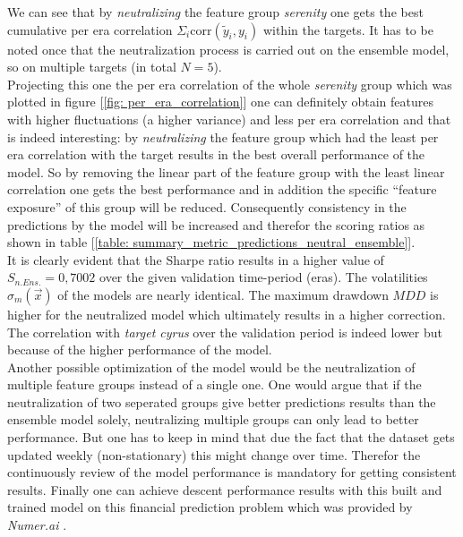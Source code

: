 \documentclass[12pt, a4paper]{article}
\begin{document}
We can see that by \textit{neutralizing} the feature group \textit{serenity} one gets the best cumulative per era correlation $\Sigma_i \text{corr}(\tilde{y}_i,y_i)$ within the targets. It has to be noted once that the neutralization process is carried out on the ensemble model, so on multiple targets (in total $N = 5$). \\
Projecting this one the per era correlation of the whole \textit{serenity} group which was plotted in figure [\ref{fig: per_era_correlation}] one can definitely obtain features with higher fluctuations (a higher variance) and less per era correlation and that is indeed interesting: by \textit{neutralizing} the feature group which had the least per era correlation with the target results in the best overall performance of the model. So by removing the linear part of the feature group with the least linear correlation one gets the best performance and in addition the specific ``feature exposure'' of this group will be reduced. Consequently consistency in the predictions by the model will be increased and therefor the scoring ratios as shown in table [\ref{table: summary_metric_predictions_neutral_ensemble}]. \\
It is clearly evident that the Sharpe ratio results in a higher value of $S_{n.Ens.} = 0{,}7002$ over the given validation time-period (eras). The volatilities $\sigma_{m}(\vec{x})$ of the models are nearly identical. The maximum drawdown $MDD$ is higher for the neutralized model which ultimately results in a higher correction. \\
The correlation with \textit{target cyrus} over the validation period is indeed lower but because of the higher performance of the model. \\
Another possible optimization of the model would be the neutralization of multiple feature groups instead of a single one. One would argue that if the neutralization of two seperated groups give better predictions results than the ensemble model solely, neutralizing multiple groups can only lead to better performance. But one has to keep in mind that due the fact that the dataset gets updated weekly (non-stationary) this might change over time. Therefor the continuously review of the model performance is mandatory for getting consistent results.
Finally one can achieve descent performance results with this built and trained model on this financial prediction problem which was provided by \textit{Numer.ai} \cite{Numerai}.
\end{document}
